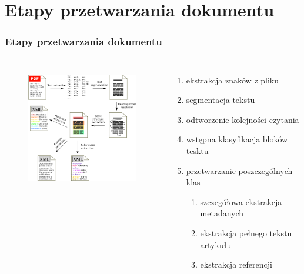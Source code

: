 \documentclass[11pt,t]{beamer}
\begin{document}
\section{Etapy przetwarzania dokumentu}
\begin{frame}
\frametitle{Etapy przetwarzania dokumentu}
\begin{columns}
\begin{figure}[ht!]
  \centering
  \includegraphics[width=6cm]{../graphics/pipeline}
  \label{fig:pipeline}
\end{figure}
\begin{enumerate}
\item ekstrakcja znaków z pliku
\item segmentacja tekstu
\item odtworzenie kolejności czytania
\item wstępna klasyfikacja bloków tesktu
\item przetwarzanie poszczególnych klas 
	\begin{enumerate}
		\item szczegółowa ekstrakcja metadanych
		\item ekstrakcja pełnego tekstu artykułu
		\item ekstrakcja referencji
	\end{enumerate}
\end{enumerate}
\end{columns}
\end{frame}
\end{document}
